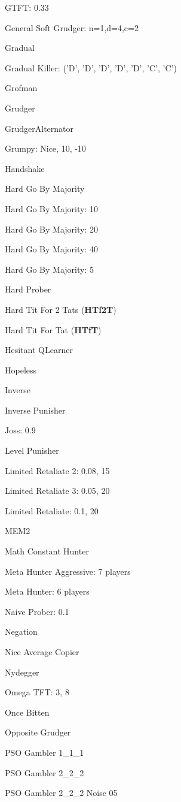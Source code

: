 \item GTFT: 0.33
\item General Soft Grudger: n=1,d=4,c=2
\item Gradual
\item Gradual Killer: ('D', 'D', 'D', 'D', 'D', 'C', 'C')
\item Grofman
\item Grudger
\item GrudgerAlternator
\item Grumpy: Nice, 10, -10
\item Handshake
\item Hard Go By Majority
\item Hard Go By Majority: 10
\item Hard Go By Majority: 20
\item Hard Go By Majority: 40
\item Hard Go By Majority: 5
\item Hard Prober
\item Hard Tit For 2 Tats
(\textbf{HTf2T})\item Hard Tit For Tat
(\textbf{HTfT})\item Hesitant QLearner
\item Hopeless
\item Inverse
\item Inverse Punisher
\item Joss: 0.9
\item Level Punisher
\item Limited Retaliate 2: 0.08, 15
\item Limited Retaliate 3: 0.05, 20
\item Limited Retaliate: 0.1, 20
\item MEM2
\item Math Constant Hunter
\item Meta Hunter Aggressive: 7 players
\item Meta Hunter: 6 players
\item Naive Prober: 0.1
\item Negation
\item Nice Average Copier
\item Nydegger
\item Omega TFT: 3, 8
\item Once Bitten
\item Opposite Grudger
\item PSO Gambler 1\_1\_1
\item PSO Gambler 2\_2\_2
\item PSO Gambler 2\_2\_2 Noise 05
